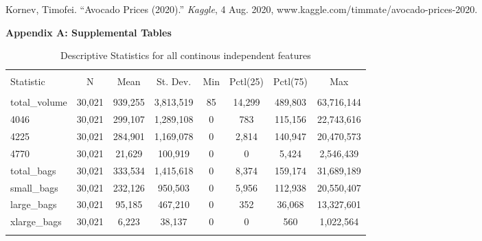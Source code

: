\documentclass[11pt]{article}\usepackage[]{graphicx}\usepackage[]{color}
\begin{document}
\noindent [5] Kornev, Timofei. “Avocado Prices (2020).” {\em Kaggle}, 4 Aug. 2020, www.kaggle.com/timmate/avocado-prices-2020. 


\hfill \break


\clearpage
\newpage
\noindent \Large{{\bf Appendix A: Supplemental Tables}}

\begin{center}

\begin{table}[H] \centering 
  \caption{Descriptive Statistics for all continous independent features} 
  \label{desc_stat_ind} 
\begin{tabular}{@{\extracolsep{5pt}}lccccccc} 
\\[-1.8ex]\hline 
\hline \\[-1.8ex] 
Statistic & \multicolumn{1}{c}{N} & \multicolumn{1}{c}{Mean} & \multicolumn{1}{c}{St. Dev.} & \multicolumn{1}{c}{Min} & \multicolumn{1}{c}{Pctl(25)} & \multicolumn{1}{c}{Pctl(75)} & \multicolumn{1}{c}{Max} \\ 
\hline \\[-1.8ex] 
total\_volume & 30,021 & 939,255 & 3,813,519 & 85 & 14,299 & 489,803 & 63,716,144 \\ 
4046 & 30,021 & 299,107 & 1,289,108 & 0 & 783 & 115,156 & 22,743,616 \\ 
4225 & 30,021 & 284,901 & 1,169,078 & 0 & 2,814 & 140,947 & 20,470,573 \\ 
4770 & 30,021 & 21,629 & 100,919 & 0 & 0 & 5,424 & 2,546,439 \\ 
total\_bags & 30,021 & 333,534 & 1,415,618 & 0 & 8,374 & 159,174 & 31,689,189 \\ 
small\_bags & 30,021 & 232,126 & 950,503 & 0 & 5,956 & 112,938 & 20,550,407 \\ 
large\_bags & 30,021 & 95,185 & 467,210 & 0 & 352 & 36,068 & 13,327,601 \\ 
xlarge\_bags & 30,021 & 6,223 & 38,137 & 0 & 0 & 560 & 1,022,564 \\ 
\hline \\[-1.8ex] 
\end{tabular} 
\end{table} 

\end{center}
\end{document}
